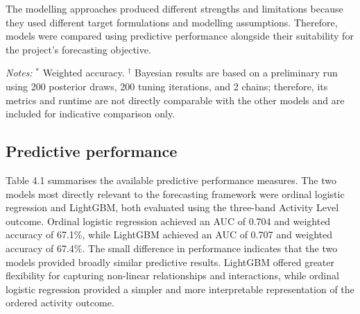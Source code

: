 \documentclass[ %
                    author={Ashrey Ashrey, Sanya Kapoor, Trisha Sharma, Yash Bhooshan Pandloskar},
                supervisor={Dr. Dalila O’Grady},
                    degree={MSc},
                     title={Using machine learning to forecast physical activity participation, volunteering and activity patterns in London},
                  subtitle={},
                      type={},
                      year={2021}]{dissertation}
\begin{document}
\noindent
The modelling approaches produced different strengths and limitations because they used different target formulations and modelling assumptions. Therefore, models were compared using predictive performance alongside their suitability for the project's forecasting objective.

\begin{table}[!htb]
\centering
\small
{}
\caption{Model-specific performance metrics}
\label{tab:model-results}
\end{table}
\footnotesize
\item \textit{Notes:} $^{*}$ Weighted accuracy. 
$^{\dagger}$ Bayesian results are based on a preliminary run using 200 posterior draws, 200 tuning iterations, and 2 chains; therefore, its metrics and runtime are not directly comparable with the other models and are included for indicative comparison only.


\FloatBarrier
\subsection{Predictive performance}

\noindent
Table 4.1 summarises the available predictive performance measures. The two models most directly relevant to the forecasting framework were ordinal logistic regression and LightGBM, both evaluated using the three-band Activity Level outcome. Ordinal logistic regression achieved an AUC of 0.704 and weighted accuracy of 67.1\%, while LightGBM achieved an AUC of 0.707 and weighted accuracy of 67.4\%. The small difference in performance indicates that the two models provided broadly similar predictive results. LightGBM offered greater flexibility for capturing non-linear relationships and interactions, while ordinal logistic regression provided a simpler and more interpretable representation of the ordered activity outcome.
\end{document}
